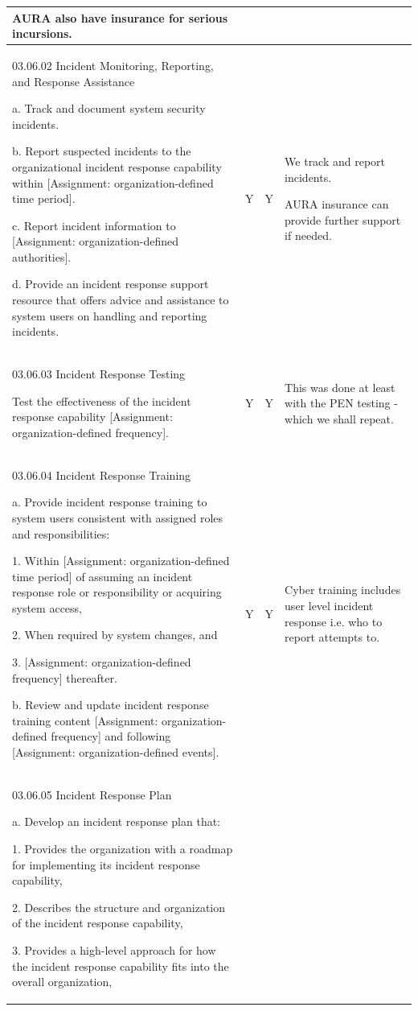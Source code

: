 \begin{longtable} {|p{}|p{}|p{}|p{} |}
{AURA also have insurance for serious incursions.} \\ \hline
{03.06.02 Incident Monitoring, Reporting, and Response Assistance

a. Track and document system security incidents.

b. Report suspected incidents to the organizational incident response capability within [Assignment: organization-defined time period].

c. Report incident information to [Assignment: organization-defined authorities].

d. Provide an incident response support resource that offers advice and assistance to system users on handling and reporting incidents.}&{Y}&{Y}&{We track and report incidents.

AURA insurance can provide further support if needed.} \\ \hline
{03.06.03 Incident Response Testing

Test the effectiveness of the incident response capability [Assignment: organization-defined frequency].}&{Y}&{Y}&{This was done at least with the PEN testing - which we shall repeat.} \\ \hline
{03.06.04 Incident Response Training

a. Provide incident response training to system users consistent with assigned roles and responsibilities:

1. Within [Assignment: organization-defined time period] of assuming an incident response role or responsibility or acquiring system access,

2. When required by system changes, and

3. [Assignment: organization-defined frequency] thereafter.

b. Review and update incident response training content [Assignment: organization-defined frequency] and following [Assignment: organization-defined events].}&{Y}&{Y}&{Cyber training includes user level incident response i.e. who to report attempts to. } \\ \hline
{03.06.05 Incident Response Plan

a. Develop an incident response plan that:

1. Provides the organization with a roadmap for implementing its incident response capability,

2. Describes the structure and organization of the incident response capability,

3. Provides a high-level approach for how the incident response capability fits into the overall organization,

}
\end{longtable}

